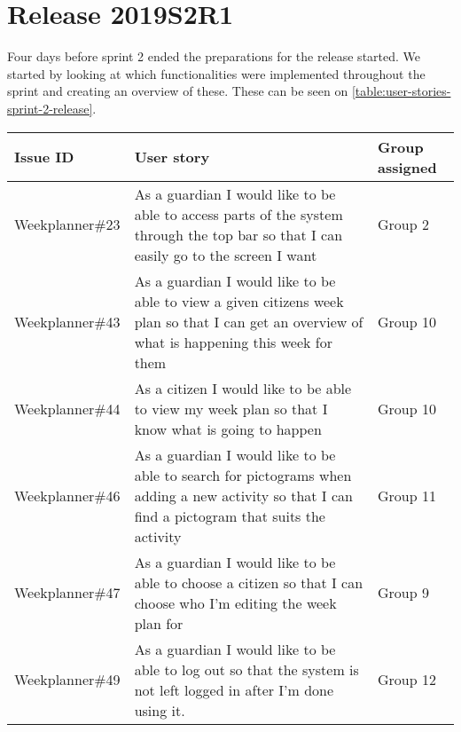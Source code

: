 \section{Release 2019S2R1}
Four days before sprint 2 ended the preparations for the release started.
We started by looking at which functionalities were implemented throughout the sprint and creating an overview of these.
These can be seen on \autoref{table:user-stories-sprint-2-release}.

\begin{table}[H]
    \small
    \begin{tabular}{|p{2.8cm}|p{7cm}|p{2cm}|}
    \hline
    Issue ID        & User story                                                                                                                                                                               & Group assigned      \\ \hline
    Weekplanner\#23 & As a guardian I would like to be able to access parts of the system through the top bar so that I can easily go to the screen I want                                                     & Group 2             \\ \hline
    Weekplanner\#43 & As a guardian I would like to be able to view a given citizens week plan so that I can get an overview of what is happening this week for them                                           & Group 10            \\ \hline
    Weekplanner\#44 & As a citizen I would like to be able to view my week plan so that I know what is going to happen                                                                                         & Group 10            \\ \hline
    Weekplanner\#46 & As a guardian I would like to be able to search for pictograms when adding a new activity so that I can find a pictogram that suits the activity                                         & Group 11            \\ \hline
    Weekplanner\#47 & As a guardian I would like to be able to choose a citizen so that I can choose who I’m editing the week plan for                                                                         & Group 9             \\ \hline
    Weekplanner\#49 & As a guardian I would like to be able to log out so that the system is not left logged in after I’m done using it.                                                                       & Group 12            \\ \hline

\end{tabular}
\end{table}
